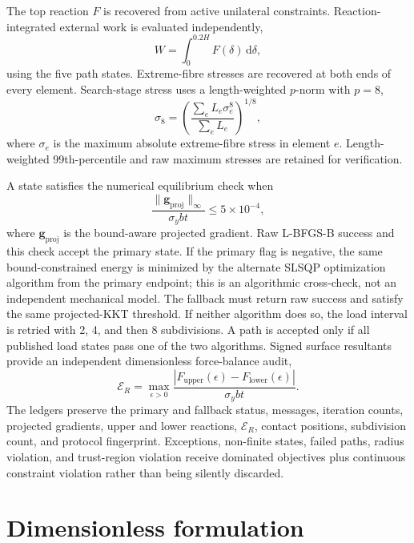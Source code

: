 \documentclass[11pt]{article}
\begin{document}
The top reaction $F$ is recovered from active unilateral constraints. Reaction-integrated external work is evaluated independently,
\begin{equation}
W=\int_0^{0.2H}F(\delta)\,\mathrm d\delta,
\label{eq:external_work}
\end{equation}
using the five path states. Extreme-fibre stresses are recovered at both ends of every element. Search-stage stress uses a length-weighted $p$-norm with $p=8$,
\begin{equation}
\sigma_{8}=\left(
\frac{\sum_eL_e\sigma_e^8}{\sum_eL_e}
\right)^{1/8},
\label{eq:stress_pnorm}
\end{equation}
where $\sigma_e$ is the maximum absolute extreme-fibre stress in element $e$. Length-weighted 99th-percentile and raw maximum stresses are retained for verification.

A state satisfies the numerical equilibrium check when
\begin{equation}
\frac{\lVert\bm g_{\mathrm{proj}}\rVert_\infty}{\sigma_ybt}
\leq5\times10^{-4},
\label{eq:solver_acceptance}
\end{equation}
where $\bm g_{\mathrm{proj}}$ is the bound-aware projected gradient. Raw L-BFGS-B success and this check accept the primary state. If the primary flag is negative, the same bound-constrained energy is minimized by the alternate SLSQP optimization algorithm from the primary endpoint; this is an algorithmic cross-check, not an independent mechanical model. The fallback must return raw success and satisfy the same projected-KKT threshold. If neither algorithm does so, the load interval is retried with 2, 4, and then 8 subdivisions. A path is accepted only if all published load states pass one of the two algorithms. Signed surface resultants provide an independent dimensionless force-balance audit,
\begin{equation}
\mathcal E_R=\max_{\epsilon>0}
\frac{|F_{\mathrm{upper}}(\epsilon)-F_{\mathrm{lower}}(\epsilon)|}
{\sigma_ybt}.
\label{eq:reaction_balance}
\end{equation}
The ledgers preserve the primary and fallback status, messages, iteration counts, projected gradients, upper and lower reactions, $\mathcal E_R$, contact positions, subdivision count, and protocol fingerprint. Exceptions, non-finite states, failed paths, radius violation, and trust-region violation receive dominated objectives plus continuous constraint violation rather than being silently discarded.

\section{Dimensionless formulation}
\end{document}
